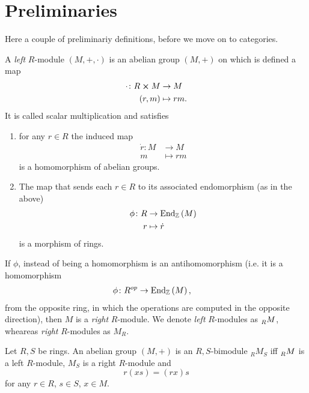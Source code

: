 \section{Preliminaries}
Here a couple of preliminariy definitions, before we move on to categories.

\begin{defn}[$R$-module]
	A {\em left} $R$-module $\left(M, +, \cdot\right)$ is an abelian group $\left(M, +\right)$ on which is defined a map
	\begin{align}
		\cdot\colon R \cross M &\to M \\
		\left(r, m\right) &\mapsto rm
	.\end{align} 
	It is called scalar multiplication and satisfies
	\begin{enumerate}
		\item for any $r \in R$ the induced map
			 \begin{align}
				\dot{r}\colon M &\to M \\
				m &\mapsto rm
			\end{align} 
			is a homomorphism of abelian groups.
		\item The map that sends each $r \in R$ to its associated endomorphism (as in the above)
			\begin{align}
				\phi\colon R &\to \mathrm{End}_{\mathbb{Z}}\left( M \right) \\
				r &\mapsto \dot{r}
			\end{align} 
			is a morphism of rings.
	\end{enumerate}
	If $\phi$, instead of being a homomorphism is an antihomomorphism (i.e. it is a homomorphism
	\begin{align}
		\phi\colon R^{op} &\to \mathrm{End}_{ \mathbb{Z}}\left( M \right)
	,\end{align} 
	from the opposite ring, in which the operations are computed in the opposite direction), then $M$ is a {\em right} $R$-module.
	We denote {\em left} $R$-modules as $\prescript{}{R}{M}$, wheareas {\em right} $R$-modules as $M_R$.
\end{defn}

\begin{defn}[Bimodule]
	Let $R,S$ be rings.
	An abelian group $\left(M, +\right)$ is an $R,S$-bimodule ${}_{R}{M}_{S}$ iff 
	$\prescript{}{R}{M}$ is a left $R$-module, $M_S$ is a right $R$-module and
	\begin{equation}
		r(xs) = (rx)s
	\end{equation} 
	for any $r \in R$, $s \in S$, $x \in M$.
\end{defn}

